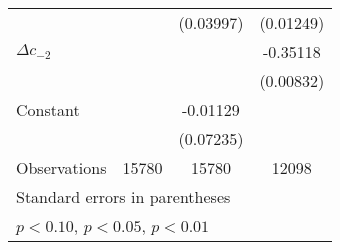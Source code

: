 {\begin{longtable}{l*{3}{c}}
                    &                     &   (0.03997)         &   (0.01249)         \\
\addlinespace
$\Delta c_{-2}$     &                     &                     &    -0.35118\sym{***}\\
                    &                     &                     &   (0.00832)         \\
\addlinespace
Constant            &                     &    -0.01129         &                     \\
                    &                     &   (0.07235)         &                     \\
\midrule
Observations        &       15780         &       15780         &       12098         \\
\bottomrule
\multicolumn{4}{l}{\footnotesize Standard errors in parentheses}\\
\multicolumn{4}{l}{\footnotesize \sym{*} \(p<0.10\), \sym{**} \(p<0.05\), \sym{***} \(p<0.01\)}\\
\end{longtable}
}
